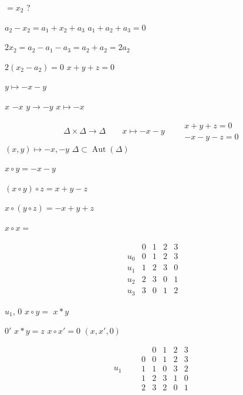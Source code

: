 \documentclass[11pt,a4paper]{article}
\begin{document}
$= x_2$ ?

$a_2 - x_2 = a_1 + x_2 + a_3$ \qquad $a_1 + a_2 + a_3 = 0$

$2 x_2 = a_2 - a_1 - a_3 = a_2 + a_2 = 2 a_2$

$2(x_2 - a_2) = 0$ \qquad $x + y + z = 0$

 \qquad $y \mapsto -x - y$

$x$ \quad $-x$ \qquad $y \to -y$ \qquad $x \mapsto -x$

\[
\Delta \times \Delta \longrightarrow \Delta \qquad x \mapsto -x - y
\qquad
\begin{array}{l}
x + y + z = 0 \\
-x - y - z = 0
\end{array}
\]
$(x, y) \mapsto -x, -y$ \qquad $\Delta \subset \operatorname{Aut}(\Delta)$

 \quad $x \circ y = -x - y$

$(x \circ y) \circ z = x + y - z$

$x \circ (y \circ z) = -x + y + z$

$x \circ x =$ 

\[
\begin{array}{c|cccc}
& 0 & 1 & 2 & 3 \\
\hline
u_0 & 0 & 1 & 2 & 3 \\
u_1 & 1 & 2 & 3 & 0 \\
u_2 & 2 & 3 & 0 & 1 \\
u_3 & 3 & 0 & 1 & 2
\end{array}
\]

 \quad $u_1$, $0$ \qquad $x \circ y =$ \quad $x \ast y$

$0'$ \qquad $x \ast y = z$ \qquad $x \circ x' = 0$ \quad $(x, x', 0)$

\[
u_1 \qquad
\begin{array}{c|cccc}
& 0 & 1 & 2 & 3 \\
\hline
0 & 0 & 1 & 2 & 3 \\
1 & 1 & 0 & 3 & 2 \\
1 & 2 & 3 & 1 & 0 \\
2 & 3 & 2 & 0 & 1
\end{array}
\]
\end{document}
